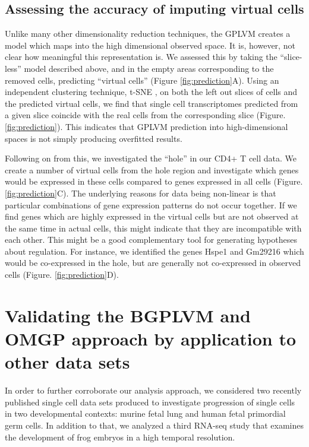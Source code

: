 \subsection{Assessing the accuracy of imputing virtual cells}

Unlike many other dimensionality reduction techniques, the GPLVM creates a model which maps into the high dimensional observed space. It is, however, not clear how meaningful this representation is. We assessed this by taking the ``slice-less'' model described above, and in the empty areas corresponding to the removed cells, predicting ``virtual cells'' (Figure \ref{fig:prediction}A). Using an independent clustering technique, t-SNE \cite{Van_der_Maaten2008-lh}, on both the left out slices of cells and the predicted virtual cells, we find that single cell transcriptomes predicted from a given slice coincide with the real cells from the corresponding slice (Figure. \ref{fig:prediction}). This indicates that GPLVM prediction into high-dimensional spaces is not simply producing overfitted results.

Following on from this, we investigated the ``hole'' in our CD4+ T cell data. We create a number of virtual cells from the hole region and investigate which genes would be expressed in these cells compared to genes expressed in all cells (Figure. \ref{fig:prediction}C). The underlying reasons for data being non-linear is that particular combinations of gene expression patterns do not occur together. If we find genes which are highly expressed in the virtual cells but are not observed at the same time in actual cells, this might indicate that they are incompatible with each other. This might be a good complementary tool for generating hypotheses about regulation. For instance, we identified the genes Hspe1 and Gm29216 which would be co-expressed in the hole, but are generally not co-expressed in observed cells (Figure. \ref{fig:prediction}D).

\section{Validating the BGPLVM and OMGP approach by application to other data sets} \label{sec:validation}

In order to further corroborate our analysis approach, we considered two recently published single cell data sets produced to investigate progression of single cells in two developmental contexts: murine fetal lung and human fetal primordial germ cells. In addition to that, we analyzed a third RNA-seq study that examines the development of frog embryos in a high temporal resolution.

